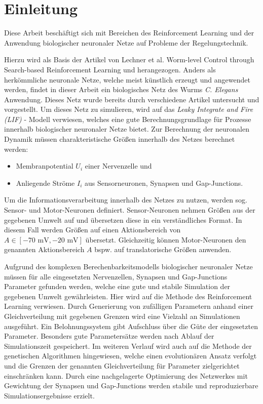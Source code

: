 %
\chapter{Einleitung}
\label{chap:einleitung}
%

	Diese Arbeit beschäftigt sich mit Bereichen des Reinforcement Learning und der Anwendung biologischer neuronaler Netze auf Probleme der Regelungstechnik. 
	
	Hierzu wird als Basis der Artikel von Lechner et al. \glqq Worm-level Control through Search-based Reinforcement Learning\grqq{} \cite{WormLevelRL} und \cite{NeuralPolicies} herangezogen. Anders als herkömmliche neuronale Netze, welche meist künstlich erzeugt und angewendet werden, findet in dieser Arbeit ein biologisches Netz des Wurms \textit{C. Elegans} Anwendung. Dieses Netz wurde bereits durch verschiedene Artikel \cite{CElegans} \cite{SimCE} \cite{Wicks1996} untersucht und vorgestellt. Um dieses Netz zu simulieren, wird auf das \textit{Leaky Integrate and Fire (LIF)} -  Modell verwiesen, welches eine gute Berechnungsgrundlage für Prozesse innerhalb biologischer neuronaler Netze bietet. Zur Berechnung der neuronalen Dynamik müssen charakteristische Größen innerhalb des Netzes berechnet werden:
	\begin{itemize}
		\item Membranpotential $U_i$ einer Nervenzelle und
		\item Anliegende Ströme $I_i$ aus Sensorneuronen, Synapsen und Gap-Junctions.
	\end{itemize}
	Um die Informationsverarbeitung innerhalb des Netzes zu nutzen, werden sog. Sensor- und Motor-Neuronen definiert. Sensor-Neuronen nehmen Größen aus der gegebenen Umwelt auf und übersetzen diese in ein verständliches Format. In diesem Fall werden Größen auf einen Aktionsbereich von $A \in [-70\text{ mV}, -20\text{ mV}]$ übersetzt. Gleichzeitig können Motor-Neuronen den genannten Aktionsbereich $A$ bspw. auf translatorische Größen anwenden.
	
	Aufgrund des komplexen Berechenbarkeitsmodells biologischer neuronaler Netze müssen für alle eingesetzten Nervenzellen, Synapsen und Gap-Junctions Parameter gefunden werden, welche eine gute und stabile Simulation der gegebenen Umwelt gewährleisten. Hier wird auf die Methode des Reinforcement Learning verwiesen. Durch Generierung von zufälligen Parametern anhand einer Gleichverteilung mit gegebenen Grenzen wird eine Vielzahl an Simulationen ausgeführt. Ein Belohnungssystem gibt Aufschluss über die Güte der eingesetzten Parameter. Besonders gute Parametersätze werden nach Ablauf der Simulationszeit gespeichert. Im weiteren Verlauf wird auch auf die Methode der genetischen Algorithmen hingewiesen, welche einen evolutionären Ansatz verfolgt und die Grenzen der genannten Gleichverteilung für Parameter zielgerichtet einschränken kann.
	Durch eine nachgelagerte Optimierung des Netzwerkes mit Gewichtung der Synapsen und Gap-Junctions werden stabile und reproduzierbare Simulationsergebnisse erzielt.
	
